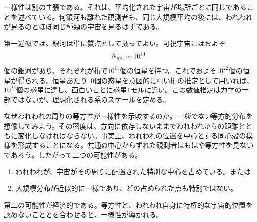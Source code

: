 一様性は別の主張である。それは、平均化された宇宙が場所ごとに同じであることを述べている。何銀河も離れた観測者も、同じ大規模平均の後には、われわれが見るのとほぼ同じ種類の宇宙を見るはずである。

第一近似では、銀河は単に質点として扱ってよい。可視宇宙にはおよそ
\begin{equation}
N_{\rm gal}\sim 10^{11}
\end{equation}
個の銀河があり、それぞれが桁で\(10^{11}\)個の恒星を持つ。これでおよそ\(10^{22}\)個の恒星が得られる。恒星あたり10個の惑星を意図的に粗い桁の推定として用いれば、\(10^{23}\)個の惑星に達し、面白いことに惑星1モルに近い。この数値推定は力学の一部ではないが、理想化される系のスケールを定める。

\begin{classroomqa}
\end{classroomqa}

なぜわれわれの周りの等方性が一様性を示唆するのか。\emph{一様でない}等方的分布を想像してみよう。その密度は、方向に依存しないままでわれわれからの距離とともに変化しなければならない。事実上、われわれの位置を中心とする同心殻の模様を形成することになる。共通の中心からずれた観測者はもはや等方性を見ないであろう。したがって二つの可能性がある。
\begin{enumerate}
\item われわれが、宇宙がその周りに配置された特別な中心を占めている。または
\item 大規模分布が近似的に一様であり、どの占められた点も特別ではない。
\end{enumerate}
第二の可能性が経済的である。等方性と、われわれ自身に特権的な宇宙的位置を認めないこととを合わせると、一様性が導かれる。

\begin{classroomqa}
\end{classroomqa}

